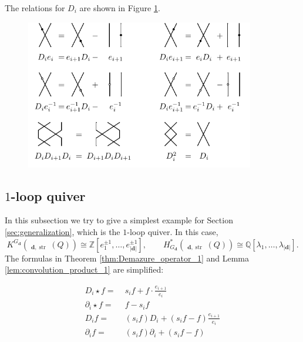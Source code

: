 \documentclass[reqno,11pt]{book}
\numberwithin{equation}{section}
\theoremstyle{plain}
\theoremstyle{plain}
\numberwithin{equation}{section}
\theoremstyle{remark}
\DeclareMathOperator{\RRep}{\widetilde{\operatorname{Rep}}}
\DeclareMathOperator{\str}{\operatorname{str}}
\newcommand{\dimvec}[1]{\mathbf{#1}}
\newcommand{\abdimvec}[1]{|\dimvec{#1}|}
\begin{document}
The relations for $D_i$ are shown in Figure \ref{fig:relations_2}.
\begin{figure}[ht]
  \vspace{0cm}
    \centering  
    \includegraphics[width=10cm]{figures/strands/relations_1.pdf}
    \caption{}
      \label{fig:relations_2}        
\end{figure}
\subsection{$1$-loop quiver}
In this subsection we try to give a simplest example for Section \ref{sec:generalization}, which is the $1$-loop quiver. In this case,
$$K^{G_{\dimvec{d}}} \left(\RRep_{\dimvec{d},\str}(Q)\right) \cong  \mathbb{Z}\!\left[ e_1^{\pm 1},\ldots,e_{\abdimvec{d}}^{\pm 1} \right], \qquad H_{G_{\dimvec{d}}}^{*}\!\!\left(\RRep_{\dimvec{d},\str}(Q)\right) \cong  \mathbb{Q}\left[\lambda_1,\ldots,\lambda_{\abdimvec{d}}\right].$$
The formulas in Theorem \ref{thm:Demazure_operator_1} and Lemma \ref{lem:convolution_product_1} are simplified:

\begin{equation*}
\begin{aligned}
  D_i \star f =\;& s_i f + f\cdot \frac{e_{i+1}}{e_{i}}\\ 
  \partial_i \star f =\;& f -s_i f\\
  D_i f =\;& (s_i f) D_i + (s_i f-f) \frac{e_{i+1}}{e_i}\\ 
  \partial_i f =\;& (s_i f) \partial_i + (s_i f-f)\\   
\end{aligned}
\end{equation*}
\end{document}
